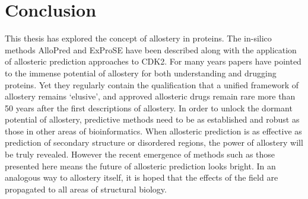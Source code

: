 \chapter{Conclusion}
\label{cha:conclusion}

This thesis has explored the concept of allostery in proteins.
The in-silico methods AlloPred and ExProSE have been described along with the application of allosteric prediction approaches to CDK2.
For many years papers have pointed to the immense potential of allostery for both understanding and drugging proteins.
Yet they regularly contain the qualification that a unified framework of allostery remains `elusive', and approved allosteric drugs remain rare more than 50 years after the first descriptions of allostery.
In order to unlock the dormant potential of allostery, predictive methods need to be as established and robust as those in other areas of bioinformatics.
When allosteric prediction is as effective as prediction of secondary structure or disordered regions, the power of allostery will be truly revealed.
However the recent emergence of methods such as those presented here means the future of allosteric prediction looks bright.
In an analogous way to allostery itself, it is hoped that the effects of the field are propagated to all areas of structural biology.
